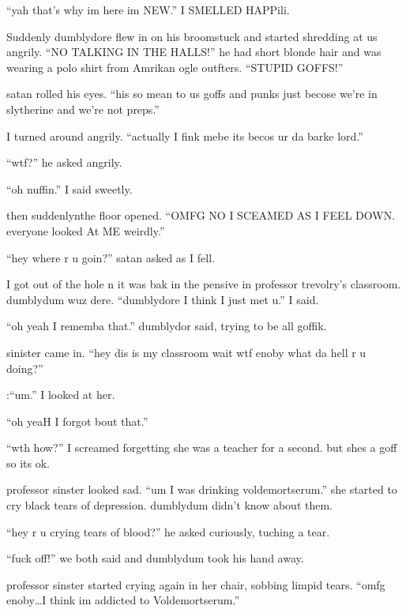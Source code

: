 \enquote{yah that's why im here im NEW.} I SMELLED HAPPili.

Suddenly dumblydore flew in on his broomstuck and started shredding at us angrily. \enquote{NO TALKING IN THE HALLS\@!} he had short blonde hair and was wearing a polo shirt from Amrikan ogle outfters. \enquote{STUPID GOFFS\@!}

satan rolled his eyes. \enquote{his so mean to us goffs and punks just becose we're in slytherine and we're not preps.}

I turned around angrily. \enquote{actually I fink mebe its becos ur da barke lord.}

\enquote{wtf?} he asked angrily.

\enquote{oh nuffin.} I said sweetly.

then suddenlyn\dotfill the floor opened.\newline
\enquote{OMFG NO I SCEAMED AS I FEEL DOWN\@. everyone looked At ME weirdly.}

\enquote{hey where r u goin?} satan asked as I fell.

I got out of the hole n it was bak in the pensive in professor trevolry's classroom. dumblydum wuz dere. \enquote{dumblydore I think I just met u.} I said.

\enquote{oh yeah I rememba that.} dumblydor said, trying to be all goffik.

sinister came in. \enquote{hey dis is my classroom wait wtf enoby what da hell r u doing?}

:\enquote{um.} I looked at her.

\enquote{oh yeaH I forgot bout that.}

\enquote{wth how?} I screamed forgetting she was a teacher for a second. but shes a goff so its ok.

professor sinster looked sad. \enquote{um I was drinking voldemortserum.} she started to cry black tears of depression. dumblydum didn't know about them.

\enquote{hey r u crying tears of blood?} he asked curiously, tuching a tear.

\enquote{fuck off!} we both said and dumblydum took his hand away.

professor sinster started crying again in her chair, sobbing limp\-id tears. \enquote{omfg enoby\ldots I think im addicted to Voldemortserum.}

